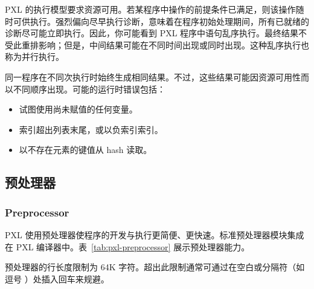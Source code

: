 PXL 的执行模型要求资源可用。若某程序中操作的前提条件已满足，则该操作随时可供执行。强烈偏向尽早执行诊断，意味着在程序初始处理期间，所有已就绪的诊断尽可能立即执行。因此，你可能看到 PXL 程序中语句乱序执行。最终结果不受此重排影响；但是，中间结果可能在不同时间出现或同时出现。这种乱序执行也称为并行执行。

同一程序在不同次执行时始终生成相同结果。不过，这些结果可能因资源可用性而以不同顺序出现。可能的运行时错误包括：
\begin{itemize}
  \item 试图使用尚未赋值的任何变量。
  \item 索引超出列表末尾，或以负索引索引。
  \item 以不存在元素的键值从 hash 读取。
\end{itemize}

\subsection{预处理器}
\subsubsection*{Preprocessor}

PXL 使用预处理器使程序的开发与执行更简便、更快速。标准预处理器模块集成在 PXL 编译器中。表~\ref{tab:pxl-preprocessor} 展示预处理器能力。

\begin{noteBox}
预处理器的行长度限制为 64K 字符。超出此限制通常可通过在空白或分隔符（如逗号 \cmd{,}）处插入回车来规避。
\end{noteBox}

